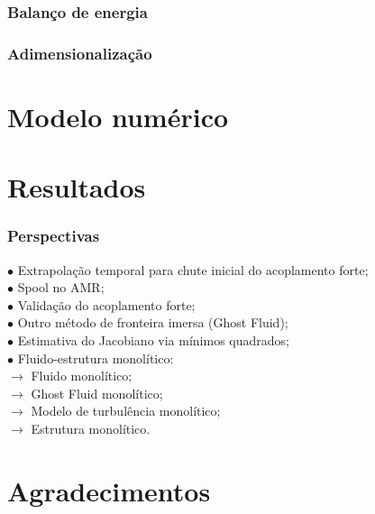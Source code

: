 \documentclass[xcolor=dvipsnames,10pt,aspectratio=169]{beamer}
\begin{document}
	
	
	
	
		\begin{frame}
			\frametitle{Balanço de energia}
		\end{frame}
	
	
	
	
	
		\begin{frame}
			\frametitle{Adimensionalização}
		\end{frame}
	

	
	
	\section{Modelo numérico}
		
	
	
	
	
	
	
	
	
		
	\section{Resultados}
		
		


		\begin{frame}
			\frametitle{Perspectivas}
			$\bullet$ Extrapolação temporal para chute inicial do acoplamento forte;\\
			$\bullet$ Spool no AMR;\\
			$\bullet$ Validação do acoplamento forte;\\
			$\bullet$ Outro método de fronteira imersa (Ghost Fluid);\\
			$\bullet$ Estimativa do Jacobiano via mínimos quadrados;\\
			$\bullet$ Fluido-estrutura monolítico:\\
			$\longrightarrow$ Fluido monolítico;\\
			$\longrightarrow$ Ghost Fluid monolítico;\\
			$\longrightarrow$ Modelo de turbulência monolítico;\\
			$\longrightarrow$ Estrutura monolítico.\\
		\end{frame}	
	
	
	
	
	
	
	
	\section{Agradecimentos}
		
\end{document}
